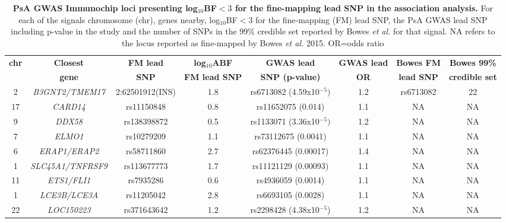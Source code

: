 \begin{landscape}
\begin{center}
\begin{longtable}[ht]{c c c c c c c c}
\caption[PsA GWAS Immunochip loci presenting log$_{10}$BF$<3$ for the fine-mapping lead SNP in the association analysis.]{\textbf{PsA GWAS Immunochip loci presenting log$_{10}$BF$<3$ for the fine-mapping lead SNP in the association analysis.} For each of the signals chromosome (chr), genes nearby, log$_{10}$BF$<3$ for the fine-mapping (FM) lead SNP, the PsA GWAS lead SNP including p-value in the study and the number of SNPs in the 99\% credible set reported by Bowes \textit{et al.} for that signal. NA refers to the locus reported as fine-mapped by Bowes \textit{et al.} 2015. OR=odds ratio}
\label{tab:PsA_loci_no_fine_mapping}\\
\toprule
\textbf{chr} & \textbf{Closest} & \textbf{FM lead} &\textbf{log$_{10}$ABF} & \textbf{GWAS lead}  &  \textbf{GWAS lead}   &\textbf{Bowes FM} & \textbf{Bowes 99\%} \\
             & \textbf{gene} & \textbf{SNP}    &\textbf{FM lead SNP}   & \textbf{SNP (p-value)} &  \textbf{OR}          &\textbf{lead SNP} & \textbf{credible set} \\
\midrule
\midrule
2	 & \textit{B3GNT2/TMEM17} & 2:62501912(INS)  &1.8   & rs6713082 (4.59x10$^{-5})$ & 1.2 &rs6713082	& 22 \\
17 & \textit{CARD14}	      & rs11150848 &0.8  & rs11652075 (0.014)       &  1.1  &NA	& NA \\
9	 & \textit{DDX58}	        &rs138398872&	0.5   & rs1133071 (3.36x10$^{-5})$ & 1.2 &	NA	&NA \\
7	 & \textit{ELMO1}	        &rs10279209&	1.1   & rs73112675 (0.0041)        &	1.1 &NA	& NA \\
6	 & \textit{ERAP1/ERAP2}	  &rs58711860&	2.7 	& rs62376445 (0.00017) & 1.4 &	NA	&NA \\
1	 & \textit{SLC45A1/TNFRSF9} &rs113677773	&	1.7 &	rs11121129 (0.00093) & 1.1 & NA	& NA \\
11 & \textit{ETS1/FLI1}	    &rs7935286&	0.6   & rs4936059 (0.0014)	& 1.1  & NA  &	NA \\ 
1	 & \textit{LCE3B/LCE3A}	  &rs11205042&	2.8 	& rs6693105 (0.0028)	& 1.1 & NA	& NA \\
22 & \textit{LOC150223}	    &rs371643642&	1.2   & rs2298428 (4.38x10$^{-5}$) & 1.2	& NA	& NA \\

\end{longtable}
\end{center}
\end{landscape}

